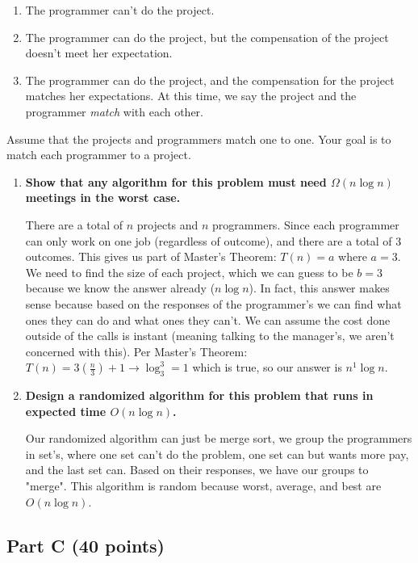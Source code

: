 \documentclass[11pt]{article}
\begin{document}
\begin{enumerate}
  \item The programmer can't do the project.
  \item The programmer can do the project, but the compensation of the
    project doesn't meet her expectation.
  \item The programmer can do the project, and the compensation for
    the project matches her expectations. At this time, we say the
    project and the programmer \textit{match} with each other.
\end{enumerate}

Assume that the projects and programmers match one to one. Your goal
is to match each programmer to a project.

\begin{enumerate}[label=\Alph*.]
\item \textbf{ Show that any algorithm for this problem must need $\Omega( n
\log{n} )$ meetings in the worst case.}

There are a total of $n$ projects and $n$ programmers. Since each programmer can only work on one job (regardless of outcome), and there are a total of $3$ outcomes. This gives us part of Master's Theorem: $T(n) = a$ where $a = 3$. We need to find the size of each project, which we can guess to be $b = 3$ because we know the answer already ($n \log n$). In fact, this answer makes sense because based on the responses of the programmer's we can find what ones they can do and what ones they can't. We can assume the cost done outside of the calls is instant (meaning talking to the manager's, we aren't concerned with this). Per Master's Theorem: $T(n) = 3(\frac{n}{3}) + 1 \to \log_3^3 = 1$ which is true, so our answer is $n^1 \log n$.

\item  \textbf{Design a randomized algorithm for this problem that runs in
expected time $O ( n \log{n} )$.}

Our randomized algorithm can just be merge sort, we group the programmers in set's, where one set can't do the problem, one set can but wants more pay, and the last set can. Based on their responses, we have our groups to "merge". This algorithm is random because worst, average, and best are $O(n \log n)$.
\end{enumerate}



\subsection*{Part C (40 points)}
\end{document}
